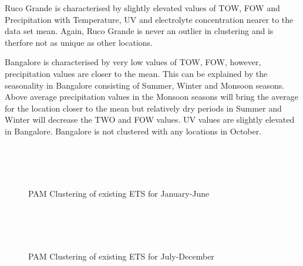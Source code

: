 \documentclass{article}
\begin{document}
Ruco Grande is characterised by slightly elevated values of TOW, FOW and Precipitation with Temperature, UV and electrolyte concentration nearer to the data set mean. Again, Ruco Grande is never an outlier in clustering and is therfore not as unique as other locations. 

Bangalore is characterised by very low values of TOW, FOW,  however,  precipitation values are closer to the mean. This can be explained by the seasonality in Bangalore consisting of Summer, Winter and Monsoon seasons. Above average precipitation values in the Monsoon seasons will bring the average for the location closer to the mean but relatively dry periods in Summer and Winter will decrease the TWO and FOW values. UV values are slightly elevated in Bangalore. Bangalore is not clustered with any locations in October.





\begin{figure}[h]
\centering
{}\hfill
{}\\
\hfill
{}\\
\hfill
{}\\
\caption{PAM Clustering of existing ETS for January-June}
\label{fig:jan_jun_ffp}
\end{figure}

\begin{figure}[h]
\centering
{}\hfill
{}\\
\hfill
{}\\
\hfill
{}\\
\caption{PAM Clustering of existing ETS for July-December}
\label{fig:jul_dec_ffp}
\end{figure}
\end{document}
